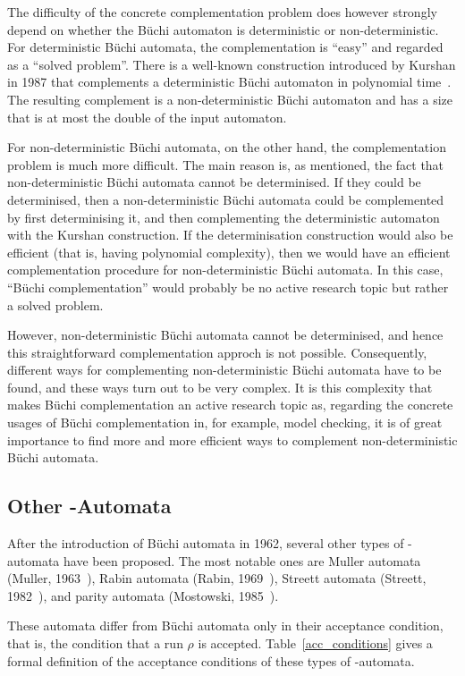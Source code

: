The difficulty of the concrete complementation problem does however strongly depend on whether the Büchi automaton is deterministic or non-deterministic. For deterministic Büchi automata, the complementation is ``easy'' and regarded as a ``solved problem''. There is a well-known construction introduced by Kurshan in 1987 that complements a deterministic Büchi automaton in polynomial time~\cite{Kurshan198759}. The resulting complement is a non-deterministic Büchi automaton and has a size that is at most the double of the input automaton.

For non-deterministic Büchi automata, on the other hand, the complementation problem is much more difficult. The main reason is, as mentioned, the fact that non-deterministic Büchi automata cannot be determinised. If they could be determinised, then a non-deterministic Büchi automata could be complemented by first determinising it, and then complementing the deterministic automaton with the Kurshan construction. If the determinisation construction would also be efficient (that is, having polynomial complexity), then we would have an efficient complementation procedure for non-deterministic Büchi automata. In this case, ``Büchi complementation'' would probably be no active research topic but rather a solved problem.

However, non-deterministic Büchi automata cannot be determinised, and hence this straightforward complementation approch is not possible. Consequently, different ways for complementing non-deterministic Büchi automata have to be found, and these ways turn out to be very complex. It is this complexity that makes Büchi complementation an active research topic as, regarding the concrete usages of Büchi complementation in, for example, model checking, it is of great importance to find more and more efficient ways to complement non-deterministic Büchi automata. 


\subsection{Other \om-Automata}
\label{om-automata}
After the introduction of Büchi automata in 1962, several other types of \om-automata have been proposed. The most notable ones are Muller automata (Muller, 1963~\cite{1963_muller}), Rabin automata (Rabin, 1969~\cite{rabin1969decidability}), Streett automata (Streett, 1982~\cite{Streett1982121}), and parity automata (Mostowski, 1985~\cite{1985_mostowski}).

These automata differ from Büchi automata only in their acceptance condition, that is, the condition that a run $\rho$ is accepted. Table~\ref{acc_conditions} gives a formal definition of the acceptance conditions of these types of \om-automata.

